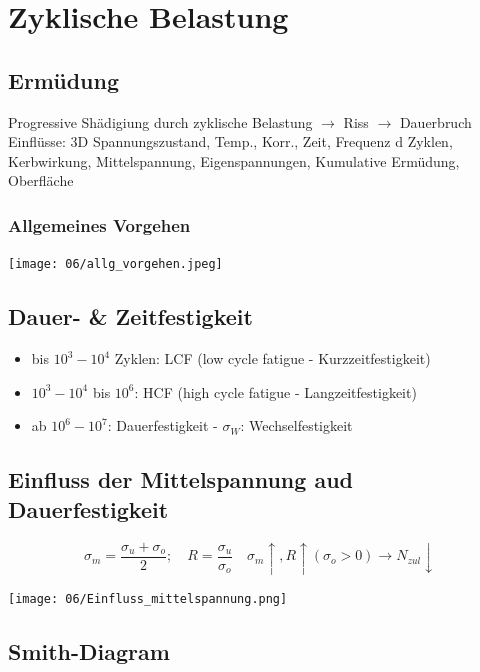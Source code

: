 \section{Zyklische Belastung}
    \subsection{Ermüdung}
        Progressive Shädigiung durch zyklische Belastung $\rightarrow$ Riss $\rightarrow$ Dauerbruch\\
        Einflüsse: 3D Spannungszustand, Temp., Korr., Zeit, Frequenz d Zyklen, Kerbwirkung, Mittelspannung, Eigenspannungen, Kumulative Ermüdung, Oberfläche
        \subsubsection{Allgemeines Vorgehen}
            \texttt{[image: 06/allg\_vorgehen.jpeg]}
        \subsection{Dauer- \& Zeitfestigkeit}
            \begin{minipage}{\linewidth}
                \begin{itemize}
                    \item bis $10^3-10^4$ Zyklen: LCF (low cycle fatigue - Kurzzeitfestigkeit)
                    \item $10^3-10^4$ bis $10^6$: HCF (high cycle fatigue - Langzeitfestigkeit)
                    \item ab $10^6-10^7$: Dauerfestigkeit - $\sigma_W$: Wechselfestigkeit
                \end{itemize}
            \end{minipage}
    \subsection{Einfluss der Mittelspannung aud Dauerfestigkeit}
        \[\sigma_m=\frac{\sigma_u+\sigma_o}{2}; \quad R=\frac{\sigma_u}{\sigma_o} \quad \sigma_m \uparrow, R \uparrow (\sigma_o >0) \rightarrow N_{zul} \downarrow\]
        \begin{center}
            \vspace{-2mm}
            \texttt{[image: 06/Einfluss\_mittelspannung.png]}
        \end{center}
    \subsection{Smith-Diagram}
        
